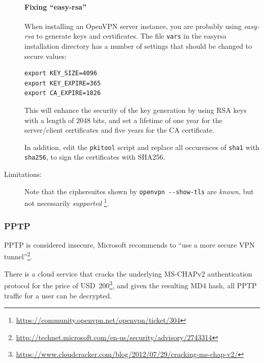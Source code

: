 \begin{description}
\paragraph{Fixing ``easy-rsa''}\mbox{}

When installing an OpenVPN server instance, you are probably using
{\it easy-rsa} to generate keys and certificates.
The file \verb|vars| in the easyrsa installation directory has a
number of settings that should be changed to secure values:

\begin{lstlisting}[breaklines]
export KEY_SIZE=4096
export KEY_EXPIRE=365
export CA_EXPIRE=1826
\end{lstlisting}

This will enhance the security of the key generation by using RSA keys
with a length of 2048 bits, and set a lifetime of one year for the
server/client certificates and five years for the CA certificate.

In addition, edit the \verb|pkitool| script and replace all occurences
of \verb|sha1| with \verb|sha256|, to sign the certificates with
SHA256.

\item[Limitations:] \mbox{}

Note that the ciphersuites shown by \verb|openvpn --show-tls| are {\it
known}, but not necessarily {\it
supported} \footnote{\url{https://community.openvpn.net/openvpn/ticket/304}}.


\end{description}


\subsubsection{PPTP}

PPTP is considered insecure, Microsoft recommends to ``use a more secure VPN
tunnel''\footnote{\url{http://technet.microsoft.com/en-us/security/advisory/2743314}}.

There is a cloud service that cracks the underlying MS-CHAPv2
authentication protocol for the price of USD~200\footnote{\url{https://www.cloudcracker.com/blog/2012/07/29/cracking-ms-chap-v2/}},
and given the resulting MD4 hash, all PPTP traffic for a user can
be decrypted.

